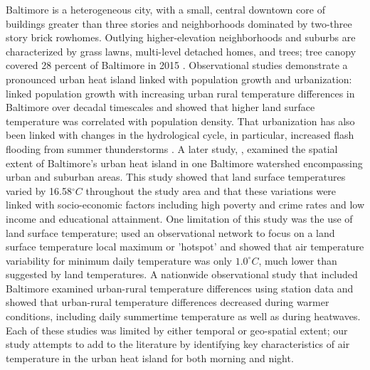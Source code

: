 Baltimore is a heterogeneous city, with a small, central downtown core of buildings greater than three stories and  neighborhoods dominated by two-three story brick rowhomes. Outlying higher-elevation neighborhoods and suburbs are characterized by grass lawns, multi-level detached homes, and trees; tree canopy covered 28 percent of Baltimore in 2015 \cite{grove2011urban}. 
Observational studies demonstrate a pronounced urban heat island linked with population growth and urbanization: \cite{brazel2000tale} linked population growth with increasing urban rural temperature differences in Baltimore over decadal timescales and showed that higher land surface temperature was correlated with population density. 
That urbanization has also been linked with changes in the hydrological cycle, in particular,    %
increased flash flooding from summer thunderstorms \citep{ntelekos2007climatological}.   
 A later study,
\cite{Huang20111753}, examined the spatial extent of Baltimore's urban heat island in one Baltimore watershed encompassing urban and suburban areas. This study showed that land surface temperatures varied by 16.58$^\circ C$ throughout the study area and that these variations were linked with socio-economic factors including high poverty and crime rates and low income and educational attainment. One limitation of this study was the use of land surface temperature; \cite{scott2017intraurban} used an observational network to focus on a land surface temperature local maximum or 'hotspot' and showed that air temperature variability for minimum daily temperature was only $1.0^\circ C$, much lower than suggested by land temperatures. 
A nationwide observational study that included Baltimore \citep{scott2018reduced} examined urban-rural temperature differences using station data and showed that urban-rural temperature differences decreased during warmer conditions, including daily summertime temperature as well as during heatwaves.  Each of these studies was limited by either temporal or geo-spatial extent; our study attempts to add to the literature by identifying key characteristics of air temperature in the urban heat island for both morning and night. 

